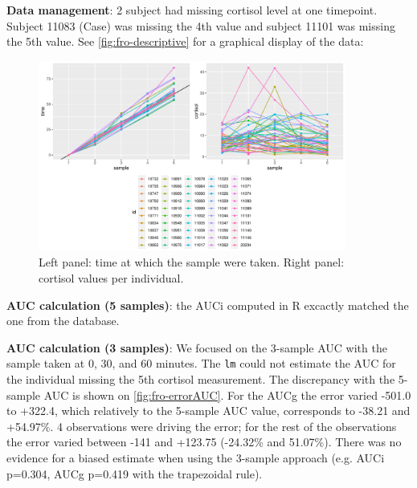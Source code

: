 \documentclass[12pt]{article}
\begin{document}
\textbf{Data management}: 2 subject had missing cortisol level at one
timepoint. Subject 11083 (Case) was missing the 4th value and subject
11101 was missing the 5th value. See \autoref{fig:fro-descriptive} for a graphical display of the
data:

\begin{figure}[!h]
\centering
\includegraphics[width=0.9\textwidth]{./figures/gg-fro-descriptive.pdf}
\caption{\label{fig:fro-descriptive}Left panel: time at which the sample were taken. Right panel: cortisol values per individual.}
\end{figure}

\bigskip

\textbf{AUC calculation (5 samples)}: the AUCi computed in R excactly matched
the one from the database.

\bigskip

\textbf{AUC calculation (3 samples)}: We focused on the 3-sample AUC with the
sample taken at 0, 30, and 60 minutes. The \texttt{lm} could not estimate the
AUC for the individual missing the 5th cortisol measurement. The
discrepancy with the 5-sample AUC is shown on
\autoref{fig:fro-errorAUC}. For the AUCg the error varied -501.0 to
+322.4, which relatively to the 5-sample AUC value, corresponds to
-38.21 and +54.97\%. 4 observations were driving the error; for the
rest of the observations the error varied between -141 and +123.75
(-24.32\% and 51.07\%). There was no evidence for a biased estimate when
using the 3-sample approach (e.g. AUCi p=0.304, AUCg p=0.419 with the
trapezoidal rule).
\end{document}
